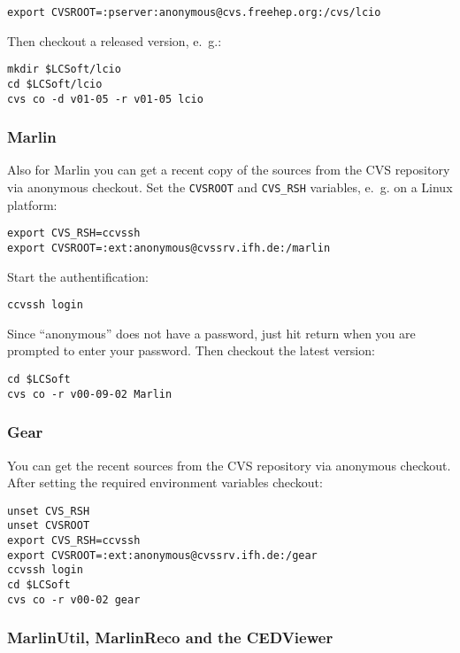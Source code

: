 \begin{verbatim}
export CVSROOT=:pserver:anonymous@cvs.freehep.org:/cvs/lcio
\end{verbatim}

Then checkout a released version, e.~g.:

\begin{verbatim}
mkdir $LCSoft/lcio
cd $LCSoft/lcio
cvs co -d v01-05 -r v01-05 lcio
\end{verbatim}

\subsubsection*{Marlin}

Also for Marlin you can get a recent copy of the sources from the CVS
repository via anonymous checkout.
Set the {\tt CVSROOT} and {\tt CVS\_RSH} variables, e.~g. on a Linux platform:

\begin{verbatim}
export CVS_RSH=ccvssh
export CVSROOT=:ext:anonymous@cvssrv.ifh.de:/marlin
\end{verbatim}

Start the authentification:

\begin{verbatim}
ccvssh login
\end{verbatim}

Since ``anonymous'' does not have a password, just hit return when you are
prompted to enter your password. Then checkout the latest version:

\begin{verbatim}
cd $LCSoft
cvs co -r v00-09-02 Marlin
\end{verbatim}

\subsubsection*{Gear}

You can get the recent sources from the CVS repository via anonymous checkout.
After setting the required environment variables checkout:

\begin{verbatim}
unset CVS_RSH
unset CVSROOT
export CVS_RSH=ccvssh
export CVSROOT=:ext:anonymous@cvssrv.ifh.de:/gear
ccvssh login
cd $LCSoft
cvs co -r v00-02 gear
\end{verbatim}

\subsubsection*{MarlinUtil, MarlinReco and the CEDViewer}

